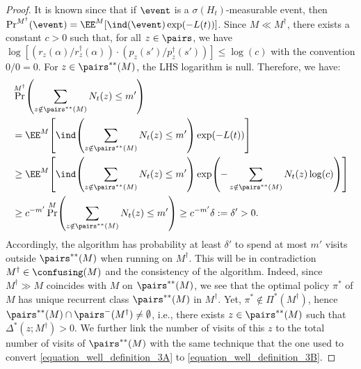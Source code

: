 \documentclass[preprint,cleveref,12pt]{colt2025}
\DeclarePairedDelimiter{\brackets}{[}{]}	%
\DeclarePairedDelimiter{\parens}{(}{)}	%
\newcommand{\indic}[1]{\ind\parens{#1}}
\def\indicator{\indic}
\newcommand{\eqindicator}[1]{\ind\parens*{#1}}
\begin{document}
\begin{proof}
        It is known since \cite{marjani_navigating_2021} that if $\event$ is a $\sigma(H_t)$-measurable event, then $\Pr^{M^\dagger}(\event) = \EE^M[\indicator{\event} \exp(-L(t))]$.
        Since $M \ll M^\dagger$, there exists a constant $c > 0$ such that, for all $z \in \pairs$, we have $\log[(r_z(\alpha)/r_z^\dagger(\alpha)) \cdot (p_z(s')/p_z^\dagger(s'))] \le \log(c)$ with the convention $0/0 = 0$.
        For $z \in \pairs^{**}(M)$, the LHS logarithm is null.
        Therefore, we have:
        \begin{align*}
            & \Pr^{M^\dagger} \parens*{
                \sum_{z \notin \pairs^{**}(M)} N_t(z) \le m'
            }
            \\
            & =
            \EE^M \brackets*{
                \eqindicator{ \sum_{z \notin \pairs^{**}(M)} N_t(z) \le m' }
                \exp \parens*{
                    - L(t)
                }
            }
            \\
            & \ge
            \EE^M \brackets*{
                \eqindicator{ \sum_{z \notin \pairs^{**}(M)} N_t(z) \le m' }
                \exp \parens*{
                    - \sum_{z \notin \pairs^{**}(M)}
                    N_t(z) \log(c)
                }
            }
            \\
            & \ge c^{-m'}
            \Pr^{M} \parens*{
                \sum_{z \notin \pairs^{**}(M)} N_t(z) \le m'
            }
            \ge
            c^{-m'} \delta := \delta' > 0.
        \end{align*}
        Accordingly, the algorithm has probability at least $\delta'$ to spend at most $m'$ visits outside $\pairs^{**}(M)$ when running on $M^\dagger$.
        This will be in contradiction $M^\dagger \in \confusing(M)$ and the consistency of the algorithm.
        Indeed, since $M^\dagger \gg M$ coincides with $M$ on $\pairs^{**}(M)$, we see that the optimal policy $\pi^*$ of $M$ has unique recurrent class $\pairs^{**}(M)$ in $M^\dagger$.
        Yet, $\pi^* \notin \Pi^*(M^\dagger)$, hence $\pairs^{**}(M) \cap \pairs^-(M^\dagger) \ne \emptyset$, i.e., there exists $z \in \pairs^{**}(M)$ such that $\Delta^*(z; M^\dagger) > 0$.
        We further link the number of visits of this $z$ to the total number of visits of $\pairs^{**}(M)$ with the same technique that the one used to convert \eqref{equation_well_definition_3A} to \eqref{equation_well_definition_3B}.
        

\end{proof}
\end{document}
